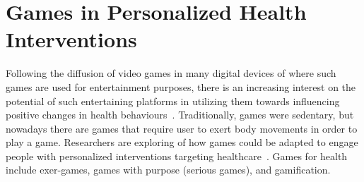 \section{Games in Personalized Health Interventions}
Following the diffusion of video games in many digital devices of where such games are used for entertainment purposes, there is an increasing interest on the potential of such entertaining platforms in utilizing them towards influencing positive changes in health behaviours~\citep{king2013gamification}. Traditionally, games were sedentary, but nowadays there are games that require user to exert body movements in order to play a game. Researchers are exploring of how games could be adapted to engage people with personalized interventions targeting healthcare~\citep{mccallum2012gamification}. Games for health include exer-games, games with purpose (serious games), and gamification.
